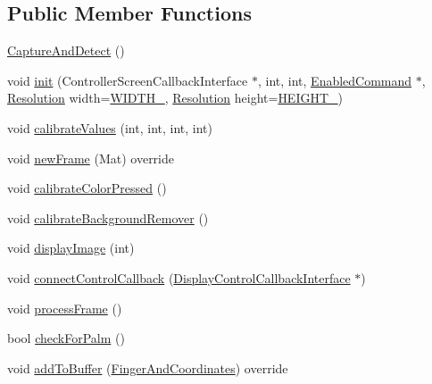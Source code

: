 \subsection*{Public Member Functions}
\begin{DoxyCompactItemize}
\item 
\hyperlink{classGestro_1_1CaptureAndDetect_a26c41eaa5100975ec0f50c97592f4bf1}{Capture\+And\+Detect} ()
\item 
void \hyperlink{classGestro_1_1CaptureAndDetect_a1df110dc696cebc95eb5d7ead2d74447}{init} (Controller\+Screen\+Callback\+Interface $\ast$, int, int, \hyperlink{classGestureDetection_1_1EnabledCommand}{Enabled\+Command} $\ast$, \hyperlink{CaptureAndDetect_8h_a3c1fc1369ee351f25804c8cde5e85ac3}{Resolution} width=\hyperlink{CaptureAndDetect_8h_a3c1fc1369ee351f25804c8cde5e85ac3a278580710dc7c233b4035c222f100b9f}{W\+I\+D\+T\+H\+\_}, \hyperlink{CaptureAndDetect_8h_a3c1fc1369ee351f25804c8cde5e85ac3}{Resolution} height=\hyperlink{CaptureAndDetect_8h_a3c1fc1369ee351f25804c8cde5e85ac3aaf8940bab7f04c8cd702f61c4d051f27}{H\+E\+I\+G\+H\+T\+\_})
\item 
void \hyperlink{classGestro_1_1CaptureAndDetect_aafb4f601f860dd38f514f6dd29a1d016}{calibrate\+Values} (int, int, int, int)
\item 
void \hyperlink{classGestro_1_1CaptureAndDetect_a7f18d1c58b2ae4241766b36aa27385e9}{new\+Frame} (Mat) override
\item 
void \hyperlink{classGestro_1_1CaptureAndDetect_ac60f9b1d192c043fa9b40c38fc5599e6}{calibrate\+Color\+Pressed} ()
\item 
void \hyperlink{classGestro_1_1CaptureAndDetect_a53065abfb6eed6c074ad4d3370b3f232}{calibrate\+Background\+Remover} ()
\item 
void \hyperlink{classGestro_1_1CaptureAndDetect_a3f1ba69514a2debbc6b2a03e76f31b65}{display\+Image} (int)
\item 
void \hyperlink{classGestro_1_1CaptureAndDetect_aa75e3ba836797d18aa02c72bbf975082}{connect\+Control\+Callback} (\hyperlink{classGestro_1_1DisplayControlCallbackInterface}{Display\+Control\+Callback\+Interface} $\ast$)
\item 
void \hyperlink{classGestro_1_1CaptureAndDetect_ac7e70bbcade4e0023541c556ee7cb34e}{process\+Frame} ()
\item 
bool \hyperlink{classGestro_1_1CaptureAndDetect_a1620075ba1bf4d52a4e455c20f7ac3d1}{check\+For\+Palm} ()
\item 
void \hyperlink{classGestro_1_1CaptureAndDetect_af376ab5418f7b235ee181d574da71fd6}{add\+To\+Buffer} (\hyperlink{classGestureDetection_1_1FingerAndCoordinates}{Finger\+And\+Coordinates}) override
\end{DoxyCompactItemize}
